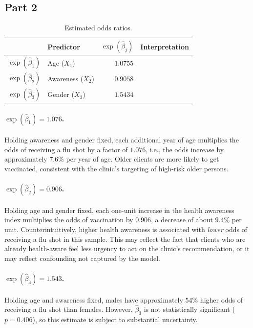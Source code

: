 \documentclass[letterpaper]{article}
\begin{document}
		\subsection{Part 2}
		
		\begin{table}[H]
			\centering
			\begin{tabular}{llrc}
				\toprule
				& Predictor & $\exp(\hat{\beta}_j)$ & Interpretation \\
				\midrule
				$\exp(\hat{\beta}_1)$ & Age ($X_1$) & $1.0755$ & \\
				$\exp(\hat{\beta}_2)$ & Awareness ($X_2$) & $0.9058$ & \\
				$\exp(\hat{\beta}_3)$ & Gender ($X_3$) & $1.5434$ & \\
				\bottomrule
			\end{tabular}
			\caption{Estimated odds ratios.}
		\end{table}
		
		\paragraph{$\exp(\hat{\beta}_1) = 1.076$.}
		Holding awareness and gender fixed, each additional year of age multiplies
		the odds of receiving a flu shot by a factor of $1.076$, i.e., the odds
		increase by approximately $7.6\%$ per year of age. Older clients are more
		likely to get vaccinated, consistent with the clinic's targeting of high-risk
		older persons.
		
		\paragraph{$\exp(\hat{\beta}_2) = 0.906$.}
		Holding age and gender fixed, each one-unit increase in the health awareness
		index multiplies the odds of vaccination by $0.906$, a decrease of about
		$9.4\%$ per unit. Counterintuitively, higher health awareness is associated
		with \emph{lower} odds of receiving a flu shot in this sample. This may
		reflect the fact that clients who are already health-aware feel less urgency
		to act on the clinic's recommendation, or it may reflect confounding not
		captured by the model.
		
		\paragraph{$\exp(\hat{\beta}_3) = 1.543$.}
		Holding age and awareness fixed, males have approximately $54\%$ higher odds
		of receiving a flu shot than females. However, $\hat{\beta}_3$ is not
		statistically significant ($p = 0.406$), so this estimate is subject to
		substantial uncertainty.
		
\end{document}
